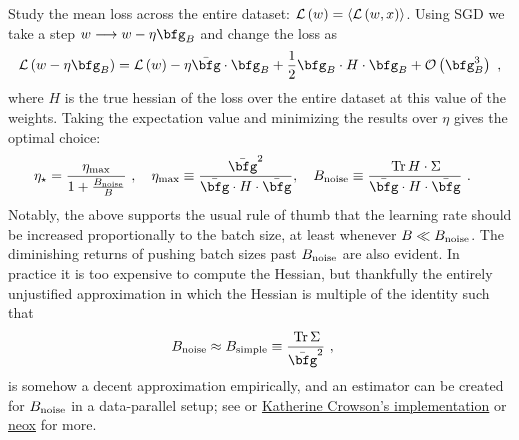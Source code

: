 Study the mean loss across the entire dataset: $ \mathcal{L} \left ( w \right ) = \langle
	\mathcal{L} \left ( w, x \right) \rangle$. Using SGD we take a step $ w \longrightarrow w -\eta \bfg _{ B }   $
and change the loss as
\begin{align}
	\Lcal \left ( w -\eta \bfg _{ B } \right )  = \Lcal \left ( w  \right ) -\eta \bar{\bfg }\cdot
	\bfg _{ B } + \frac{ 1 }{ 2 } \bfg _{ B }\cdot  H \cdot  \bfg _{ B } + \Ocal \left( \bfg _{ B }
	^{ 3 } \right)\ ,
\end{align}
where $ H $ is the true hessian of the loss over the entire dataset at this value of the weights.
Taking the expectation value and minimizing the results  over $ \eta  $ gives the optimal choice:
\begin{align}
	\eta _{ \star } & = \frac{ \eta _{ {\rm  max} } }{ 1 + \frac{ B _{ {\rm  noise} } }{ B } }\ , \quad  \eta _{ {\rm  max} }\equiv \frac{ \bar{\bfg } ^{ 2 } }{ \bar{\bfg }\cdot  H \cdot  \bar{\bfg } } , \quad  B _{ {\rm  noise} } \equiv \frac{ \Tr H \cdot \Sigma  }{  \bar{\bfg }\cdot  H \cdot  \bar{\bfg }}\ .
\end{align}
Notably, the above supports the usual rule of thumb that the learning rate should be increased
proportionally to the batch size, at least whenever $ B \ll B _{ {\rm  noise} } $. The diminishing
returns of pushing batch sizes past $ B _{ {\rm noise} } $ are also evident. In practice it is too
expensive to compute the Hessian, but thankfully the entirely unjustified approximation in which the
Hessian is multiple of the identity such that
\begin{align}
	B _{ {\rm noise} } & \approx B _{ {\rm  simple} } \equiv \frac{ \Tr \Sigma  }{ \bar{\bfg } ^{ 2 } }\ ,
\end{align}
is somehow a decent approximation empirically, and an estimator can be created for $ B _{ {\rm noise} } $
in a data-parallel setup; see \cite{mccandlish2018empirical} or
\href{https://github.com/crowsonkb/k-diffusion/blob/ab527a9a6d347f364e3d185ba6d714e22d80cb3c/k_diffusion/gns.py#L1}{Katherine
	Crowson's implementation} or \href{https://github.com/EleutherAI/gpt-neox/blob/408e29d9c746a02d842917bb7447c5c4be0b42d4/megatron/gradient_noise_scale/gradient_noise_scale.py#L1}{neox} for more.


